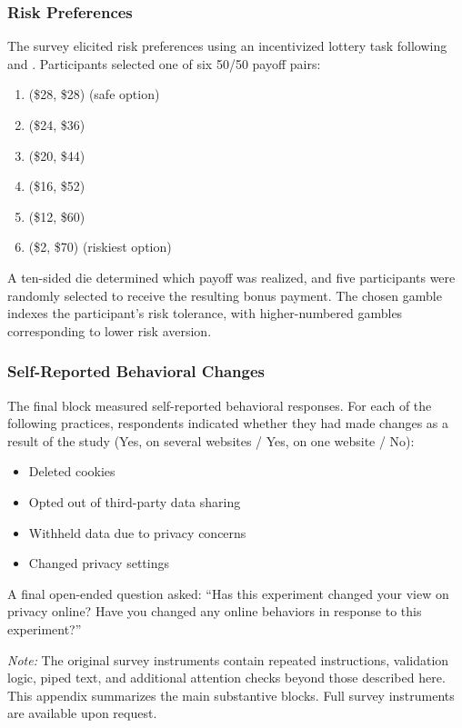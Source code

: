 \documentclass[12pt]{article}
\theoremstyle{definition}
\theoremstyle{remark}
\begin{document}
\begin{appendix}
\subsubsection{Risk Preferences}\label{sec:survey_endline_risk}

The survey elicited risk preferences using an incentivized lottery task following \cite{CHARNESS201343} and \cite{RePEc:kap:jrisku:v:41:y:2010:i:3:p:219-243}. Participants selected one of six 50/50 payoff pairs:
\begin{enumerate}[leftmargin=2em,itemsep=1pt]
    \item (\$28, \$28) (safe option)
    \item (\$24, \$36)
    \item (\$20, \$44)
    \item (\$16, \$52)
    \item (\$12, \$60)
    \item (\$2, \$70) (riskiest option)
\end{enumerate}
A ten-sided die determined which payoff was realized, and five participants were randomly selected to receive the resulting bonus payment. The chosen gamble indexes the participant's risk tolerance, with higher-numbered gambles corresponding to lower risk aversion.

\subsubsection{Self-Reported Behavioral Changes}\label{sec:survey_endline_behavior}

The final block measured self-reported behavioral responses. For each of the following practices, respondents indicated whether they had made changes as a result of the study (Yes, on several websites / Yes, on one website / No):
\begin{itemize}[leftmargin=2em,itemsep=1pt]
    \item Deleted cookies
    \item Opted out of third-party data sharing
    \item Withheld data due to privacy concerns
    \item Changed privacy settings
\end{itemize}
A final open-ended question asked: ``Has this experiment changed your view on privacy online? Have you changed any online behaviors in response to this experiment?''

\vspace{6pt}
\noindent\textit{Note:} The original survey instruments contain repeated instructions, validation logic, piped text, and additional attention checks beyond those described here. This appendix summarizes the main substantive blocks. Full survey instruments are available upon request.




\end{appendix}
\end{document}
